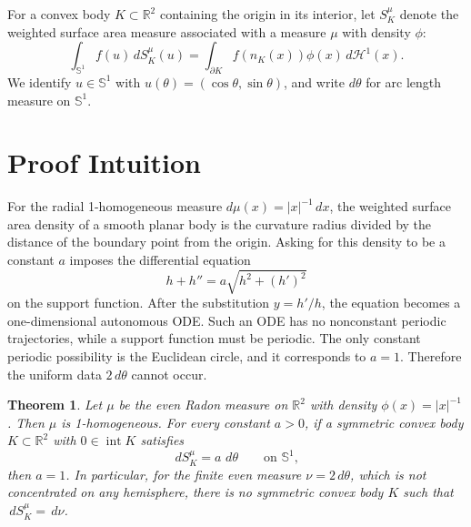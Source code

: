 \documentclass[11pt]{article}
\newtheorem{theorem}{Theorem}
\newcommand{\R}{\mathbb{R}}
\newcommand{\Sone}{\mathbb{S}^{1}}
\newcommand{\dd}{\,d}
\begin{document}
For a convex body \(K\subset\R^2\) containing the origin in its interior, let
\(S^\mu_K\) denote the weighted surface area measure associated with a measure
\(\mu\) with density \(\phi\):
\[
  \int_{\Sone} f(u)\dd S^\mu_K(u)
  =
  \int_{\partial K} f(n_K(x))\phi(x)\dd \mathcal H^1(x).
\]
We identify \(u\in\Sone\) with \(u(\theta)=(\cos\theta,\sin\theta)\), and
write \(d\theta\) for arc length measure on \(\Sone\).

\section*{Proof Intuition}

For the radial 1-homogeneous measure \(d\mu(x)=|x|^{-1}\dd x\), the weighted
surface area density of a smooth planar body is the curvature radius divided
by the distance of the boundary point from the origin.  Asking for this
density to be a constant \(a\) imposes the differential equation
\[
  h+h'' = a\sqrt{h^2+(h')^2}
\]
on the support function.  After the substitution \(y=h'/h\), the equation
becomes a one-dimensional autonomous ODE.  Such an ODE has no nonconstant
periodic trajectories, while a support function must be periodic.  The only
constant periodic possibility is the Euclidean circle, and it corresponds to
\(a=1\).  Therefore the uniform data \(2\,d\theta\) cannot occur.

\begin{theorem}
Let \(\mu\) be the even Radon measure on \(\R^2\) with density
\(\phi(x)=|x|^{-1}\).  Then \(\mu\) is 1-homogeneous.  For every constant
\(a>0\), if a symmetric convex body \(K\subset\R^2\) with \(0\in\operatorname{int}K\)
satisfies
\[
  \dd S^\mu_K = a\,\dd\theta
  \qquad\text{on }\Sone,
\]
then \(a=1\).  In particular, for the finite even measure
\(\nu=2\,d\theta\), which is not concentrated on any hemisphere, there is no
symmetric convex body \(K\) such that \(\dd S^\mu_K=\dd\nu\).
\end{theorem}
\end{document}
